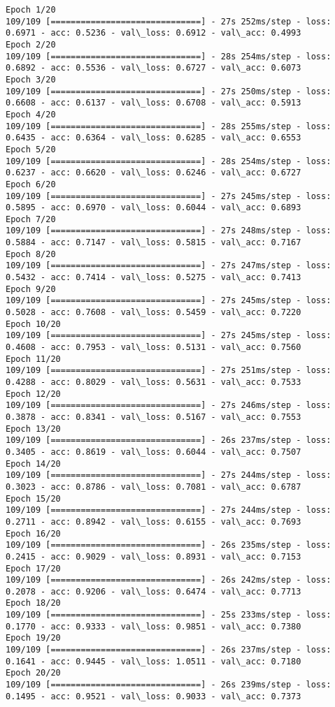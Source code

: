 \documentclass[11pt]{article}
\begin{document}
    \begin{Verbatim}[commandchars=\\\{\}]
Epoch 1/20
109/109 [==============================] - 27s 252ms/step - loss: 0.6971 - acc: 0.5236 - val\_loss: 0.6912 - val\_acc: 0.4993
Epoch 2/20
109/109 [==============================] - 28s 254ms/step - loss: 0.6892 - acc: 0.5536 - val\_loss: 0.6727 - val\_acc: 0.6073
Epoch 3/20
109/109 [==============================] - 27s 250ms/step - loss: 0.6608 - acc: 0.6137 - val\_loss: 0.6708 - val\_acc: 0.5913
Epoch 4/20
109/109 [==============================] - 28s 255ms/step - loss: 0.6435 - acc: 0.6364 - val\_loss: 0.6285 - val\_acc: 0.6553
Epoch 5/20
109/109 [==============================] - 28s 254ms/step - loss: 0.6237 - acc: 0.6620 - val\_loss: 0.6246 - val\_acc: 0.6727
Epoch 6/20
109/109 [==============================] - 27s 245ms/step - loss: 0.5895 - acc: 0.6970 - val\_loss: 0.6044 - val\_acc: 0.6893
Epoch 7/20
109/109 [==============================] - 27s 248ms/step - loss: 0.5884 - acc: 0.7147 - val\_loss: 0.5815 - val\_acc: 0.7167
Epoch 8/20
109/109 [==============================] - 27s 247ms/step - loss: 0.5432 - acc: 0.7414 - val\_loss: 0.5275 - val\_acc: 0.7413
Epoch 9/20
109/109 [==============================] - 27s 245ms/step - loss: 0.5028 - acc: 0.7608 - val\_loss: 0.5459 - val\_acc: 0.7220
Epoch 10/20
109/109 [==============================] - 27s 245ms/step - loss: 0.4608 - acc: 0.7953 - val\_loss: 0.5131 - val\_acc: 0.7560
Epoch 11/20
109/109 [==============================] - 27s 251ms/step - loss: 0.4288 - acc: 0.8029 - val\_loss: 0.5631 - val\_acc: 0.7533
Epoch 12/20
109/109 [==============================] - 27s 246ms/step - loss: 0.3878 - acc: 0.8341 - val\_loss: 0.5167 - val\_acc: 0.7553
Epoch 13/20
109/109 [==============================] - 26s 237ms/step - loss: 0.3405 - acc: 0.8619 - val\_loss: 0.6044 - val\_acc: 0.7507
Epoch 14/20
109/109 [==============================] - 27s 244ms/step - loss: 0.3023 - acc: 0.8786 - val\_loss: 0.7081 - val\_acc: 0.6787
Epoch 15/20
109/109 [==============================] - 27s 244ms/step - loss: 0.2711 - acc: 0.8942 - val\_loss: 0.6155 - val\_acc: 0.7693
Epoch 16/20
109/109 [==============================] - 26s 235ms/step - loss: 0.2415 - acc: 0.9029 - val\_loss: 0.8931 - val\_acc: 0.7153
Epoch 17/20
109/109 [==============================] - 26s 242ms/step - loss: 0.2078 - acc: 0.9206 - val\_loss: 0.6474 - val\_acc: 0.7713
Epoch 18/20
109/109 [==============================] - 25s 233ms/step - loss: 0.1770 - acc: 0.9333 - val\_loss: 0.9851 - val\_acc: 0.7380
Epoch 19/20
109/109 [==============================] - 26s 237ms/step - loss: 0.1641 - acc: 0.9445 - val\_loss: 1.0511 - val\_acc: 0.7180
Epoch 20/20
109/109 [==============================] - 26s 239ms/step - loss: 0.1495 - acc: 0.9521 - val\_loss: 0.9033 - val\_acc: 0.7373

    \end{Verbatim}
\end{document}
